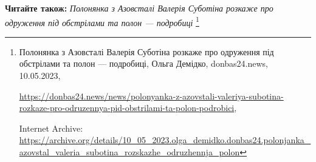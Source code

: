  
 
 
 
 

\textbf{Читайте також:} \emph{Полонянка з Азовсталі Валерія Суботіна розкаже про одруження під обстрілами та полон — подробиці}%
\footnote{Полонянка з Азовсталі Валерія Суботіна розкаже про одруження під обстрілами та полон — подробиці, Ольга Демідко, donbas24.news, 10.05.2023, \par%
\url{https://donbas24.news/news/polonyanka-z-azovstali-valeriya-subotina-rozkaze-pro-odruzennya-pid-obstrilami-ta-polon-podrobici}, \par%
Internet Archive: \url{https://archive.org/details/10_05_2023.olga_demidko.donbas24.polonjanka_azovstal_valeria_subotina_rozskazhe_odruzhennja_polon}%
}

